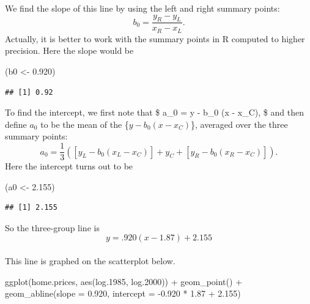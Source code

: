 \documentclass[
]{book}
\newenvironment{Shaded}{\begin{snugshade}}{\end{snugshade}}
\newcommand{\AttributeTok}[1]{\textcolor[rgb]{0.77,0.63,0.00}{#1}}
\newcommand{\FloatTok}[1]{\textcolor[rgb]{0.00,0.00,0.81}{#1}}
\newcommand{\FunctionTok}[1]{\textcolor[rgb]{0.00,0.00,0.00}{#1}}
\newcommand{\NormalTok}[1]{#1}
\newcommand{\OtherTok}[1]{\textcolor[rgb]{0.56,0.35,0.01}{#1}}
\newcommand{\SpecialCharTok}[1]{\textcolor[rgb]{0.00,0.00,0.00}{#1}}
\begin{document}
We find the slope of this line by using the left and right summary points:
\[
  b_0 = \frac{y_R - y_L}{x_R - x_L} .
\]
Actually, it is better to work with the summary points in R computed to higher precision. Here the slope would be

\begin{Shaded}
\begin{Highlighting}[]
\NormalTok{(b0 }\OtherTok{\textless{}{-}} \FloatTok{0.920}\NormalTok{)}
\end{Highlighting}
\end{Shaded}

\begin{verbatim}
## [1] 0.92
\end{verbatim}

To find the intercept, we first note that
\$
a\_0 = y - b\_0 (x - x\_C),
\$
and then define \(a_0\) to be the mean of the \{\(y - b_0(x - x_C)\)\}, averaged over the three summary points:
\[
a_0 = \frac{1}{3} \left([y_L - b_0 (x_L - x_C)] + y_C + [y_R - b_0 (x_R - x_C) ] \right).
\]
Here the intercept turns out to be

\begin{Shaded}
\begin{Highlighting}[]
\NormalTok{(a0 }\OtherTok{\textless{}{-}} \FloatTok{2.155}\NormalTok{)}
\end{Highlighting}
\end{Shaded}

\begin{verbatim}
## [1] 2.155
\end{verbatim}

So the three-group line is
\[          
          y = .920 (x - 1.87) + 2.155
\]\\
This line is graphed on the scatterplot below.

\begin{Shaded}
\begin{Highlighting}[]
\FunctionTok{ggplot}\NormalTok{(home.prices, }\FunctionTok{aes}\NormalTok{(log}\FloatTok{.1985}\NormalTok{, log}\FloatTok{.2000}\NormalTok{)) }\SpecialCharTok{+}
  \FunctionTok{geom\_point}\NormalTok{() }\SpecialCharTok{+}
  \FunctionTok{geom\_abline}\NormalTok{(}\AttributeTok{slope =} \FloatTok{0.920}\NormalTok{,}
              \AttributeTok{intercept =} \SpecialCharTok{{-}}\FloatTok{0.920} \SpecialCharTok{*} \FloatTok{1.87} \SpecialCharTok{+} \FloatTok{2.155}\NormalTok{) }
\end{Highlighting}
\end{Shaded}
\end{document}
